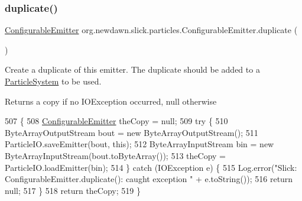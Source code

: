 \subsubsection{\texorpdfstring{duplicate()}{duplicate()}}
{\footnotesize\ttfamily \mbox{\hyperlink{classorg_1_1newdawn_1_1slick_1_1particles_1_1_configurable_emitter}{Configurable\+Emitter}} org.\+newdawn.\+slick.\+particles.\+Configurable\+Emitter.\+duplicate (\begin{DoxyParamCaption}{ }\end{DoxyParamCaption})\hspace{0.3cm}{\ttfamily [inline]}}

Create a duplicate of this emitter. The duplicate should be added to a \mbox{\hyperlink{classorg_1_1newdawn_1_1slick_1_1particles_1_1_particle_system}{Particle\+System}} to be used. \begin{DoxyReturn}{Returns}
a copy if no I\+O\+Exception occurred, null otherwise 
\end{DoxyReturn}

\begin{DoxyCode}
507                                            \{
508         \mbox{\hyperlink{classorg_1_1newdawn_1_1slick_1_1particles_1_1_configurable_emitter_ad86bb9c713312612cc48cf2097a50196}{ConfigurableEmitter}} theCopy = null;
509         \textcolor{keywordflow}{try} \{
510             ByteArrayOutputStream bout = \textcolor{keyword}{new} ByteArrayOutputStream();
511             ParticleIO.saveEmitter(bout, \textcolor{keyword}{this});
512             ByteArrayInputStream bin = \textcolor{keyword}{new} ByteArrayInputStream(bout.toByteArray());
513             theCopy = ParticleIO.loadEmitter(bin);
514         \} \textcolor{keywordflow}{catch} (IOException e) \{
515             Log.error(\textcolor{stringliteral}{"Slick: ConfigurableEmitter.duplicate(): caught exception "} + e.toString());
516             \textcolor{keywordflow}{return} null;
517         \}
518         \textcolor{keywordflow}{return} theCopy;
519     \}
\end{DoxyCode}
\mbox{\label{classorg_1_1newdawn_1_1slick_1_1particles_1_1_configurable_emitter_a27d040118a59ae29818f23ceb97f37f8}} 
